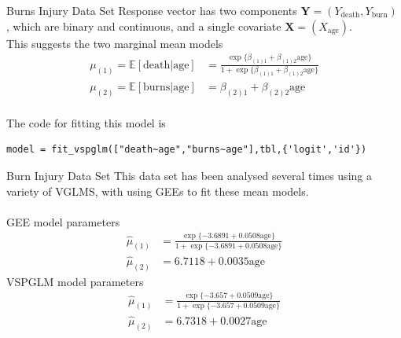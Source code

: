 \documentclass[9pt,notes=hide]{beamer}
\newcommand{\vect}[1]{\boldsymbol #1}
\newcommand{\Em}{\mathbb E}
\newcommand{\X}{\vect{X}}
\newcommand{\Y}{\vect{Y}}
\begin{document}
\begin{frame}[fragile]{Burns Injury Data Set}
	Response vector has two components $\Y = (Y_{\text{death}}, Y_{\text{burn}})$ , which are binary and continuous,  and a single covariate $\X = (X_{\text{age}})$.\\
	\pause
	This suggests the two marginal mean models
	\begin{align*}
		\mu_{(1)} = \Em[\text{death}|\text{age}] & =  \frac{\exp\{\beta_{(1)1} + \beta_{(1)2}\text{age}\}}{1 + \exp\{\beta_{(1)1} +\beta_{(1)2}\text{age}\}} \\
		\mu_{(2)} = \Em[\text{burns}|\text{age}] & = \beta_{(2)1} + \beta_{(2)2}\text{age}
	\end{align*}
	\pause
	\vspace{0.2cm}\\
	The code for fitting this model is
	\begin{verbatim}
model = fit_vspglm(["death~age","burns~age"],tbl,{'logit','id'})
\end{verbatim}

\end{frame}



\begin{frame}{Burn Injury Data Set}
	This data set has been analysed several times using a variety of VGLMS,
	with \textcite{Huang2017}  using GEEs to fit these mean models.\\
	\vspace{0.5cm}\\
	\pause
	GEE model parameters
	\begin{align*}
		\hat{\mu}_{(1)} & = \frac{\exp\{-3.6891 + 0.0508\text{age}\}}{1 + \exp\{-3.6891 + 0.0508\text{age}\}} \\
		\hat{\mu}_{(2)} & =  6.7118 + 0.0035\text{age} \nonumber
	\end{align*}
	\pause
	VSPGLM model parameters
	\begin{align*}
		\hat{\mu}_{(1)} & = \frac{\exp\{-3.657  + 0.0509\text{age}\}}{1 + \exp\{-3.657  + 0.0509\text{age}\}} \\
		\hat{\mu}_{(2)} & =  6.7318 + 0.0027\text{age} \nonumber
	\end{align*}
\end{frame}
\end{document}
